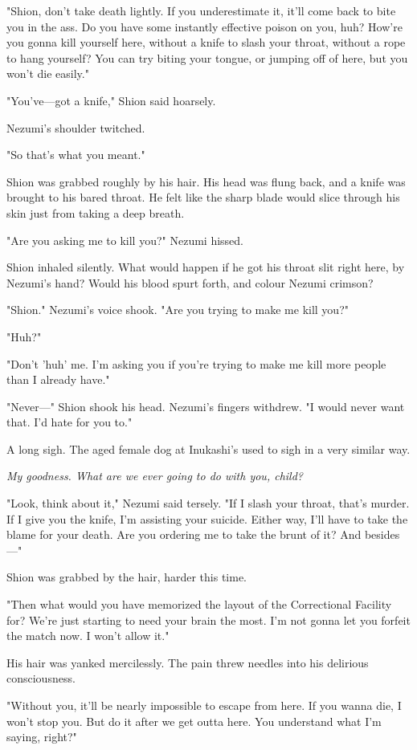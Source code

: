 "Shion, don't take death lightly. If you underestimate it, it'll come
back to bite you in the ass. Do you have some instantly effective poison
on you, huh? How're you gonna kill yourself here, without a knife to
slash your throat, without a rope to hang yourself? You can try biting
your tongue, or jumping off of here, but you won't die easily."

"You've---got a knife," Shion said hoarsely.

Nezumi's shoulder twitched.

"So that's what you meant."

Shion was grabbed roughly by his hair. His head was flung back, and a
knife was brought to his bared throat. He felt like the sharp blade
would slice through his skin just from taking a deep breath.

"Are you asking me to kill you?" Nezumi hissed.

Shion inhaled silently. What would happen if he got his throat slit
right here, by Nezumi's hand? Would his blood spurt forth, and colour
Nezumi crimson?

"Shion." Nezumi's voice shook. "Are you trying to make me kill you?"

"Huh?"

"Don't 'huh' me. I'm asking you if you're trying to make me kill more
people than I already have."

"Never---" Shion shook his head. Nezumi's fingers withdrew. "I would never
want that. I'd hate for you to."

A long sigh. The aged female dog at Inukashi's used to sigh in a very
similar way.

\emph{My goodness. What are we ever going to do with you, child?}

"Look, think about it," Nezumi said tersely. "If I slash your throat,
that's murder. If I give you the knife, I'm assisting your suicide.
Either way, I'll have to take the blame for your death. Are you ordering
me to take the brunt of it? And besides---"

Shion was grabbed by the hair, harder this time.

"Then what would you have memorized the layout of the Correctional
Facility for? We're just starting to need your brain the most. I'm not
gonna let you forfeit the match now. I won't allow it."

His hair was yanked mercilessly. The pain threw needles into his
delirious consciousness.

"Without you, it'll be nearly impossible to escape from here. If you
wanna die, I won't stop you. But do it after we get outta here. You
understand what I'm saying, right?"

